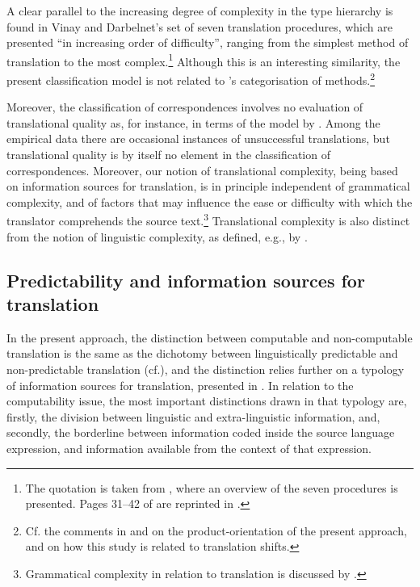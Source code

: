 \documentclass[output=paper]{LSP/langsci}
\begin{document}
A clear parallel to the increasing degree of complexity in the type hierarchy is found in Vinay and Darbelnet's set of seven translation procedures, which are presented ``in increasing order of difficulty'', ranging from the simplest method of translation to the most complex.\footnote{The quotation is taken from \citet[92]{Venuti2000}, where an overview of the seven procedures is presented. Pages 31--42 of \citet{Vinay1995} are reprinted in \citet[84-93]{Venuti2000}.} Although this is an interesting similarity, the present classification model is not related to \citeauthor{Vinay1995}'s categorisation of methods.\footnote{Cf. the comments in  and  on the product-orientation of the present approach, and on how this study is related to translation shifts.} 

Moreover, the classification of correspondences involves no evaluation of translational quality as, for instance, in terms of the model by \citet{House1997}. Among the empirical data there are occasional instances of unsuccessful translations, but translational quality is by itself no element in the classification of correspondences. Moreover, our notion of translational complexity, being based on information sources for translation, is in principle independent of grammatical complexity, and of factors that may influence the ease or difficulty with which the translator comprehends the source text.\footnote{Grammatical complexity in relation to translation is discussed by \citet{Izquierdo2000}.} Translational complexity is also distinct from the notion of linguistic complexity, as defined, e.g., by \citet{Dahl2004}.

\subsection{Predictability and information sources for translation}\label{sec:thunes:3.3}

In the present approach, the distinction between computable and non-computable translation is the same as the dichotomy between linguistically predictable and non-predictable translation (cf.), and the distinction relies further on a typology of information sources for translation, presented in \citet[87--106]{Thunes2011}. In relation to the computability issue, the most important distinctions drawn in that typology are, firstly, the division between linguistic and extra-linguistic information, and, secondly, the borderline between information coded inside the source language expression, and information available from the context of that expression. 
\end{document}
